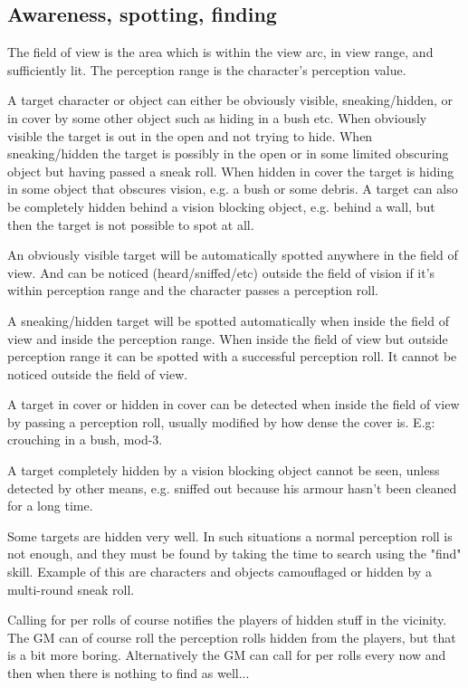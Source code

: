 \subsection*{Awareness, spotting, finding}
The field of view is the area which is within the view arc, in view range, and sufficiently lit. The perception range is the character's perception value.

A target character or object can either be obviously visible, sneaking/hidden, or in cover by some other object such as hiding in a bush etc. When obviously visible the target is out in the open and not trying to hide. When sneaking/hidden the target is possibly in the open or in some limited obscuring object but having passed a sneak roll. When hidden in cover the target is hiding in some object that obscures vision, e.g. a bush or some debris. A target can also be completely hidden behind a vision blocking object, e.g. behind a wall, but then the target is not possible to spot at all.

An obviously visible target will be automatically spotted anywhere in the field of view. And can be noticed (heard/sniffed/etc) outside the field of vision if it's within perception range and the character passes a perception roll.

A sneaking/hidden target will be spotted automatically when inside the field of view and inside the perception range. When inside the field of view but outside perception range it can be spotted with a successful perception roll. It cannot be noticed outside the field of view.

A target in cover or hidden in cover can be detected when inside the field of view by passing a perception roll, usually modified by how dense the cover is. E.g: crouching in a bush, mod-3.

A target completely hidden by a vision blocking object cannot be seen, unless detected by other means, e.g. sniffed out because his armour hasn't been cleaned for a long time.

Some targets are hidden very well. In such situations a normal perception roll is not enough, and they must be found by taking the time to search using the "find" skill. Example of this are characters and objects camouflaged or hidden by a multi-round sneak roll.

Calling for per rolls of course notifies the players of hidden stuff in the vicinity.
The GM can of course roll the perception rolls hidden from the players, but that is a bit more boring. Alternatively the GM can call for per rolls every now and then when there is nothing to find as well...


